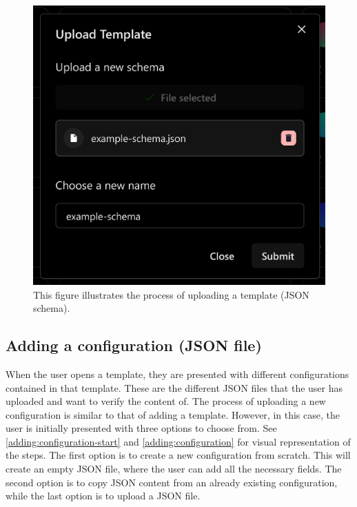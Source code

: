 \begin{figure}[!ht]
\begin{minipage}{0.3\textwidth}
   \end{minipage}
   \hspace{0.04cm}
   \begin{minipage}{0.25\textwidth}
     \centering
     \includegraphics[width=.9\linewidth]{Figures/templates-page/file-selected.pdf}
   \end{minipage}
   \caption[Template (JSON schema) upload process]{This figure illustrates the process of uploading a template (JSON schema).}
   \label{adding:template}
\end{figure}


\subsection{Adding a configuration (JSON file)}

When the user opens a template, they are presented with different configurations contained in that template. These are the different JSON files that the user has uploaded and want to verify the content of. The process of uploading a new configuration is similar to that of adding a template. However, in this case, the user is initially presented with three options to choose from. See \autoref{adding:configuration-start} and \autoref{adding:configuration} for visual representation of the steps. The first option is to create a new configuration from scratch. This will create an empty JSON file, where the user can add all the necessary fields. The second option is to copy JSON content from an already existing configuration, while the last option is to upload a JSON file. 

